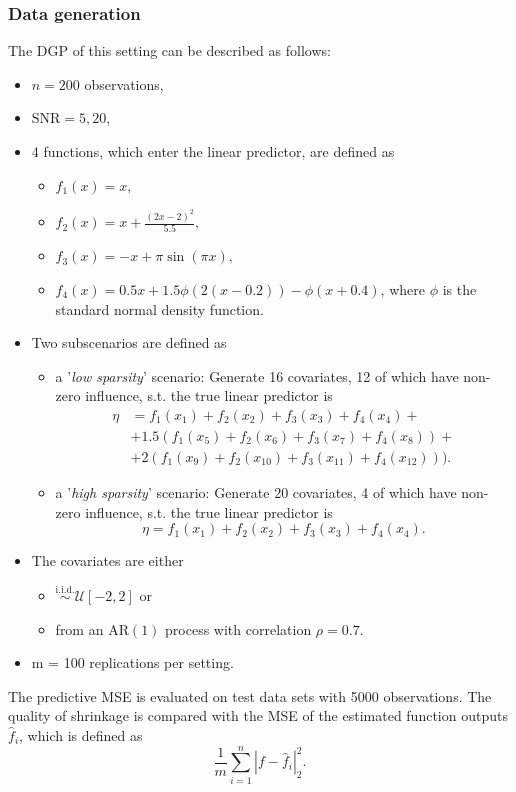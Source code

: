 \documentclass[12pt,letterpaper]{article}
\numberwithin{equation}{subsection}
\begin{document}
\subsubsection{Data generation}
The DGP of this setting can be described as follows:
\begin{itemize}
\item $n = 200$ observations,
\item $\text{SNR} = 5, 20$,
\item 4 functions, which enter the linear predictor, are defined as
\begin{itemize}
\item $f_1(x) = x,$
\item $f_2(x) = x + \frac{(2x-2)^2}{5.5},$
\item $f_3(x) = -x + \pi\sin(\pi x),$
\item $f_4(x) = 0.5x + 1.5\phi(2(x-0.2))-\phi(x+0.4)$, where $\phi$ is the standard normal density function.
\end{itemize}
\item Two subscenarios are defined as
\begin{itemize}
\item a '\textit{low sparsity}' scenario: Generate 16 covariates, 12 of which have non-zero influence, s.t. the true linear predictor is 
\begin{align*}
\eta & = f_1(x_1) + f_2(x_2) + f_3(x_3) + f_4(x_4) + \\
& + 1.5( f_1(x_5) + f_2(x_6) + f_3(x_7) + f_4(x_8)) + \\ 
& + 2(f_1(x_9) + f_2(x_{10}) + f_3(x_{11}) + f_4(x_{12})) ).
\end{align*}
\item a '\textit{high sparsity}' scenario: Generate 20 covariates, 4 of which have non-zero influence, s.t. the true linear predictor is 
\begin{equation*}
\eta = f_1(x_1) + f_2(x_2) + f_3(x_3) + f_4(x_4). 
\end{equation*}
\end{itemize}
\item The covariates are either 
\begin{itemize}
\item $\overset{\text{i.i.d.}}{\sim} \mathcal{U}[-2,2]$ or 
\item from an $\text{AR}(1)$ process with correlation $\rho = 0.7$.
\end{itemize}
\item m = 100 replications per setting.
\end{itemize}
The predictive MSE is evaluated on test data sets with 5000 observations. The quality of shrinkage is compared with the MSE of the estimated function outputs$\hat{f}_i$, which is defined as
\[
\frac{1}{m}\sum^n_{i=1}|f - \hat{f}_i|^2_2.
\]
\label{sec:sfdgp}
\end{document}
